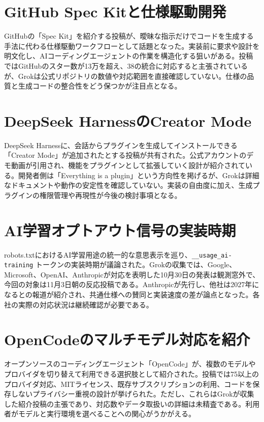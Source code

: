 \section{GitHub Spec Kitと仕様駆動開発}
GitHubの「Spec Kit」を紹介する投稿が、曖昧な指示だけでコードを生成する手法に代わる仕様駆動ワークフローとして話題となった。実装前に要求や設計を明文化し、AIコーディングエージェントの作業を構造化する狙いがある。投稿ではGitHubのスター数が13万を超え、38の統合に対応すると主張されているが、Grokは公式リポジトリの数値や対応範囲を直接確認していない。仕様の品質と生成コードの整合性をどう保つかが注目点となる。

\section{DeepSeek HarnessのCreator Mode}
DeepSeek Harnessに、会話からプラグインを生成してインストールできる「Creator Mode」が追加されたとする投稿が共有された。公式アカウントのデモ動画が引用され、機能をプラグインとして拡張していく設計が紹介されている。開発者側は「Everything is a plugin」という方向性を掲げるが、Grokは詳細なドキュメントや動作の安定性を確認していない。実装の自由度に加え、生成プラグインの権限管理や再現性が今後の検討事項となる。

\section{AI学習オプトアウト信号の実装時期}
robots.txtにおけるAI学習用途の統一的な意思表示を巡り、\texttt{\_\_usage\_ai-training} トークンの実装時期が議論された。Grokの収集では、Google、Microsoft、OpenAI、Anthropicが対応を表明した10月30日の発表は観測窓外で、今回の対象は11月3日朝の反応投稿である。Anthropicが先行し、他社は2027年になるとの報道が紹介され、共通仕様への賛同と実装速度の差が論点となった。各社の実際の対応状況は継続確認が必要である。

\section{OpenCodeのマルチモデル対応を紹介}
オープンソースのコーディングエージェント「OpenCode」が、複数のモデルやプロバイダを切り替えて利用できる選択肢として紹介された。投稿では75以上のプロバイダ対応、MITライセンス、既存サブスクリプションの利用、コードを保存しないプライバシー重視の設計が挙げられた。ただし、これらはGrokが収集した紹介投稿の主張であり、対応数やデータ取扱いの詳細は未精査である。利用者がモデルと実行環境を選べることへの関心がうかがえる。

